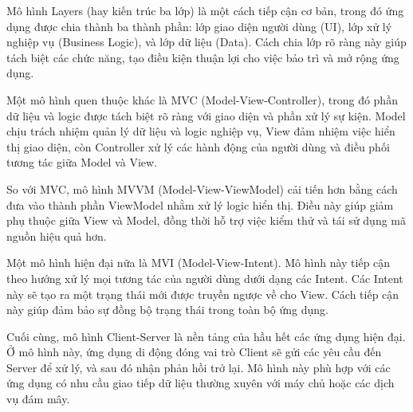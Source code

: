     \begin{flushleft}
        \hspace*{0.8cm}Mô hình Layers (hay kiến trúc ba lớp) là một cách tiếp cận cơ bản, trong đó ứng dụng được chia thành ba thành phần: lớp giao diện người dùng (UI), lớp xử lý nghiệp vụ (Business Logic), và lớp dữ liệu (Data). Cách chia lớp rõ ràng này giúp tách biệt các chức năng, tạo điều kiện thuận lợi cho việc bảo trì và mở rộng ứng dụng.
      \end{flushleft}

      \begin{flushleft}
        \hspace*{0.8cm}Một mô hình quen thuộc khác là MVC (Model-View-Controller), trong đó phần dữ liệu và logic được tách biệt rõ ràng với giao diện và phần xử lý sự kiện. Model chịu trách nhiệm quản lý dữ liệu và logic nghiệp vụ, View đảm nhiệm việc hiển thị giao diện, còn Controller xử lý các hành động của người dùng và điều phối tương tác giữa Model và View.
      \end{flushleft}

      \begin{flushleft}
        \hspace*{0.8cm}So với MVC, mô hình MVVM (Model-View-ViewModel) cải tiến hơn bằng cách đưa vào thành phần ViewModel nhằm xử lý logic hiển thị. Điều này giúp giảm phụ thuộc giữa View và Model, đồng thời hỗ trợ việc kiểm thử và tái sử dụng mã nguồn hiệu quả hơn.
      \end{flushleft}

      \begin{flushleft}
        \hspace*{0.8cm}Một mô hình hiện đại nữa là MVI (Model-View-Intent). Mô hình này tiếp cận theo hướng xử lý mọi tương tác của người dùng dưới dạng các Intent. Các Intent này sẽ tạo ra một trạng thái mới được truyền ngược về cho View. Cách tiếp cận này giúp đảm bảo sự đồng bộ trạng thái trong toàn bộ ứng dụng.
      \end{flushleft}

      \begin{flushleft}
        \hspace*{0.8cm}Cuối cùng, mô hình Client-Server là nền tảng của hầu hết các ứng dụng hiện đại. Ở mô hình này, ứng dụng di động đóng vai trò Client sẽ gửi các yêu cầu đến Server để xử lý, và sau đó nhận phản hồi trở lại. Mô hình này phù hợp với các ứng dụng có nhu cầu giao tiếp dữ liệu thường xuyên với máy chủ hoặc các dịch vụ đám mây.
      \end{flushleft}

